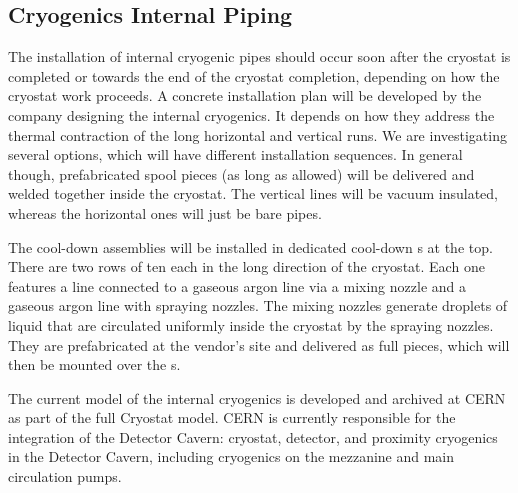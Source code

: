 
\subsection{Cryogenics Internal Piping}
\label{sec:fdgen-slow-cryo-install-pipes}


The installation of internal cryogenic pipes should occur soon after the cryostat is completed or towards the end of the cryostat completion, depending on how the cryostat work proceeds. A concrete installation plan will be developed by the company designing the internal cryogenics. It depends on how they address the thermal contraction of the long horizontal and vertical runs. We are investigating several options, which will have different installation sequences. In general though, prefabricated spool pieces (as long as allowed) will be delivered and welded together inside the cryostat. The vertical lines will be vacuum insulated, whereas the horizontal ones will just be bare pipes.

The cool-down assemblies will be installed in dedicated cool-down \fdth{}s at the top. There are two rows of ten each in the long direction of the cryostat. Each one features a \lar line connected to a gaseous argon line via a mixing nozzle and a gaseous argon line with spraying nozzles. The mixing nozzles generate droplets of liquid that are circulated uniformly inside the cryostat by the spraying nozzles. They are prefabricated at the vendor's site and delivered as full pieces, which will then be mounted over the \fdth{}s.

The current \threed model of the internal cryogenics is developed and archived at CERN as part of the full Cryostat model. CERN is currently responsible for the integration of the Detector Cavern: cryostat, detector, and proximity cryogenics in the Detector Cavern, including cryogenics on the mezzanine and main \lar circulation pumps.

